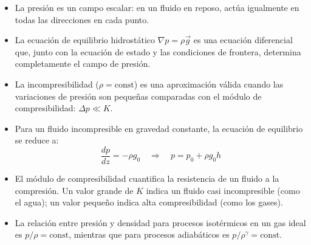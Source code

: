 \begin{itemize}
    \item La presión es un campo escalar: en un fluido en reposo, actúa igualmente en todas las direcciones en cada punto.
    
    \item La ecuación de equilibrio hidrostático $\nabla p = \rho\vec{g}$ es una ecuación diferencial que, junto con la ecuación de estado y las condiciones de frontera, determina completamente el campo de presión.
    
    \item La incompresibilidad ($\rho = \text{const}$) es una aproximación válida cuando las variaciones de presión son pequeñas comparadas con el módulo de compresibilidad: $\Delta p \ll K$.
    
    \item Para un fluido incompresible en gravedad constante, la ecuación de equilibrio se reduce a:
    \begin{equation}
        \frac{dp}{dz} = -\rho g_0 \quad \Longrightarrow \quad p = p_0 + \rho g_0 h
    \end{equation}
    
    \item El módulo de compresibilidad cuantifica la resistencia de un fluido a la compresión. Un valor grande de $K$ indica un fluido casi incompresible (como el agua); un valor pequeño indica alta compresibilidad (como los gases).
    
    \item La relación entre presión y densidad para procesos isotérmicos en un gas ideal es $p/\rho = \text{const}$, mientras que para procesos adiabáticos es $p/\rho^\gamma = \text{const}$.
\end{itemize}
